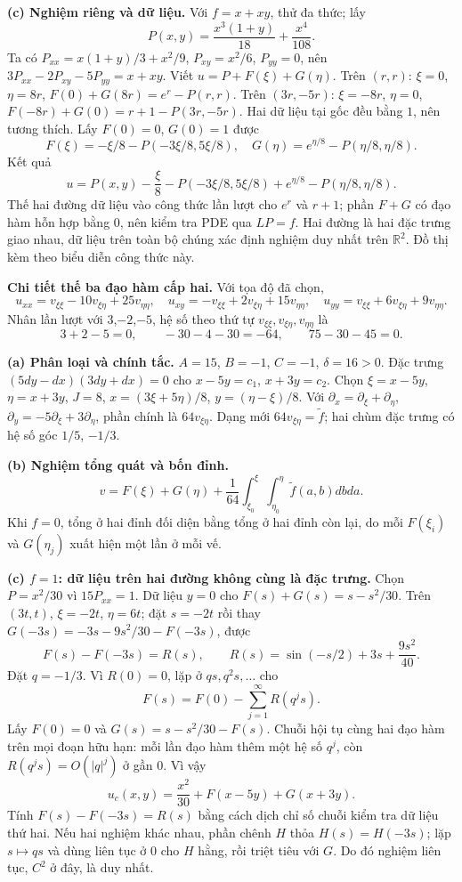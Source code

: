\textbf{(c) Nghiệm riêng và dữ liệu.} Với $f=x+xy$, thử đa thức; lấy
\[P(x,y)=\frac{x^3(1+y)}{18}+\frac{x^4}{108}.\]
Ta có $P_{xx}=x(1+y)/3+x^2/9$, $P_{xy}=x^2/6$, $P_{yy}=0$, nên $3P_{xx}-2P_{xy}-5P_{yy}=x+xy$. Viết $u=P+F(\xi)+G(\eta)$. Trên $(r,r)$: $\xi=0$, $\eta=8r$, $F(0)+G(8r)=e^r-P(r,r)$. Trên $(3r,-5r)$: $\xi=-8r$, $\eta=0$, $F(-8r)+G(0)=r+1-P(3r,-5r)$. Hai dữ liệu tại gốc đều bằng $1$, nên tương thích. Lấy $F(0)=0$, $G(0)=1$ được
\[F(\xi)=-\xi/8-P(-3\xi/8,5\xi/8),\quad
G(\eta)=e^{\eta/8}-P(\eta/8,\eta/8).\]
Kết quả
\[\boxed{u=P(x,y)-\frac\xi8-P(-3\xi/8,5\xi/8)+e^{\eta/8}-P(\eta/8,\eta/8).}\]
Thế hai đường dữ liệu vào công thức lần lượt cho $e^r$ và $r+1$; phần $F+G$ có đạo hàm hỗn hợp bằng $0$, nên kiểm tra PDE qua $LP=f$. Hai đường là hai đặc trưng giao nhau, dữ liệu trên toàn bộ chúng xác định nghiệm duy nhất trên $\mathbb R^2$. Đồ thị kèm theo biểu diễn công thức này.

\textbf{Chi tiết thế ba đạo hàm cấp hai.} Với tọa độ đã chọn,
\[u_{xx}=v_{\xi\xi}-10v_{\xi\eta}+25v_{\eta\eta},\quad u_{xy}=-v_{\xi\xi}+2v_{\xi\eta}+15v_{\eta\eta},\quad u_{yy}=v_{\xi\xi}+6v_{\xi\eta}+9v_{\eta\eta}.\]
Nhân lần lượt với $3$,$-2$,$-5$, hệ số theo thứ tự $v_{\xi\xi},v_{\xi\eta},v_{\eta\eta}$ là
\[3+2-5=0,\qquad -30-4-30=-64,\qquad 75-30-45=0.\]

\textbf{(a) Phân loại và chính tắc.} $A=15$, $B=-1$, $C=-1$, $\delta=16>0$. Đặc trưng $(5dy-dx)(3dy+dx)=0$ cho $x-5y=c_1$, $x+3y=c_2$. Chọn $\xi=x-5y$, $\eta=x+3y$, $J=8$, $x=(3\xi+5\eta)/8$, $y=(\eta-\xi)/8$. Với $\partial_x=\partial_\xi+\partial_\eta$, $\partial_y=-5\partial_\xi+3\partial_\eta$, phần chính là $64v_{\xi\eta}$. Dạng mới $64v_{\xi\eta}=\widetilde f$; hai chùm đặc trưng có hệ số góc $1/5$, $-1/3$.

\textbf{(b) Nghiệm tổng quát và bốn đỉnh.}
\[v=F(\xi)+G(\eta)+\frac1{64}\int_{\xi_0}^{\xi}\int_{\eta_0}^{\eta}\widetilde f(a,b)dbda.\]
Khi $f=0$, tổng ở hai đỉnh đối diện bằng tổng ở hai đỉnh còn lại, do mỗi $F(\xi_i)$ và $G(\eta_j)$ xuất hiện một lần ở mỗi vế.

\textbf{(c) $f=1$: dữ liệu trên hai đường không cùng là đặc trưng.} Chọn $P=x^2/30$ vì $15P_{xx}=1$. Dữ liệu $y=0$ cho $F(s)+G(s)=s-s^2/30$. Trên $(3t,t)$, $\xi=-2t$, $\eta=6t$; đặt $s=-2t$ rồi thay $G(-3s)=-3s-9s^2/30-F(-3s)$, được
\[F(s)-F(-3s)=R(s),\qquad R(s)=\sin(-s/2)+3s+\frac{9s^2}{40}.\]
Đặt $q=-1/3$. Vì $R(0)=0$, lặp ở $qs,q^2s,\ldots$ cho
\[F(s)=F(0)-\sum_{j=1}^{\infty}R(q^js).\]
Lấy $F(0)=0$ và $G(s)=s-s^2/30-F(s)$. Chuỗi hội tụ cùng hai đạo hàm trên mọi đoạn hữu hạn: mỗi lần đạo hàm thêm một hệ số $q^j$, còn $R(q^js)=O(|q|^j)$ ở gần $0$. Vì vậy
\[\boxed{u_c(x,y)=\frac{x^2}{30}+F(x-5y)+G(x+3y).}\]
Tính $F(s)-F(-3s)=R(s)$ bằng cách dịch chỉ số chuỗi kiểm tra dữ liệu thứ hai. Nếu hai nghiệm khác nhau, phần chênh $H$ thỏa $H(s)=H(-3s)$; lặp $s\mapsto qs$ và dùng liên tục ở $0$ cho $H$ hằng, rồi triệt tiêu với $G$. Do đó nghiệm liên tục, $C^2$ ở đây, là duy nhất.

